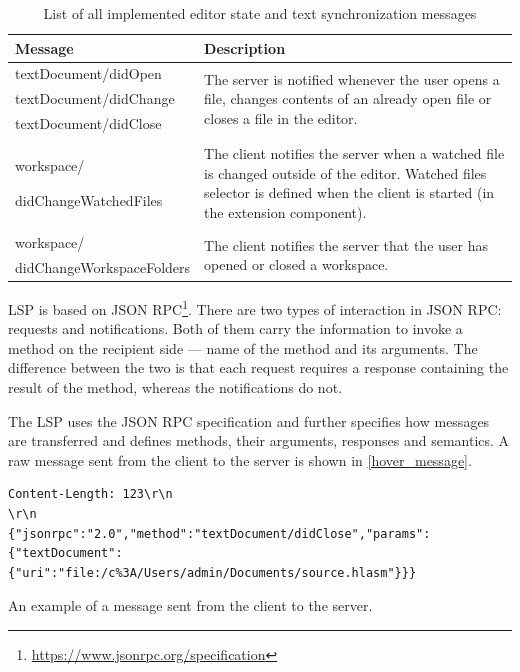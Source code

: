 \begin{table}
	\centering
	\begin{tabular}{ll}
		
		\toprule
		Message & Description \\ \midrule
		textDocument/didOpen & \multirow{3}{8.5cm}{The server is notified whenever the user opens a file, changes contents of an already open file or closes a file in the editor.} \\
		textDocument/didChange & \\
		textDocument/didClose & \\
		& \\
		 &\multirow{4}{8.5cm}{The client notifies the server when a watched file is changed outside of the editor. Watched files selector is defined when the client is started (in the extension component).} \\
		workspace/ & \\
		didChangeWatchedFiles& \\
		& \\
		& \\
		workspace/ & \multirow{2}{8.5cm}{The client notifies the server that the user has opened or closed a workspace.} \\
		didChangeWorkspaceFolders & \\ \bottomrule
	\end{tabular}
	
	\caption{List of all implemented editor state and text synchronization messages}
	\label{lsp_text_sync_methods}
\end{table}


LSP is based on JSON RPC\footnote{\url{https://www.jsonrpc.org/specification}}. There are two types of interaction in JSON RPC: requests and notifications. Both of them carry the information to invoke a method on the recipient side ---  name of the method and its arguments. The difference between the two is that each request requires a response containing the result of the method, whereas the notifications do not.

The LSP uses the JSON RPC specification and further specifies how messages are transferred and defines methods, their arguments, responses and semantics. A raw message sent from the client to the server is shown in \cref{hover_message}.

\begin{listing}
	\begin{verbatim}
Content-Length: 123\r\n
\r\n
{"jsonrpc":"2.0","method":"textDocument/didClose","params":{"textDocument":
{"uri":"file:/c%3A/Users/admin/Documents/source.hlasm"}}}
	\end{verbatim}
	\caption{An example of a message sent from the client to the server.}
	\label{hover_message}
\end{listing}

